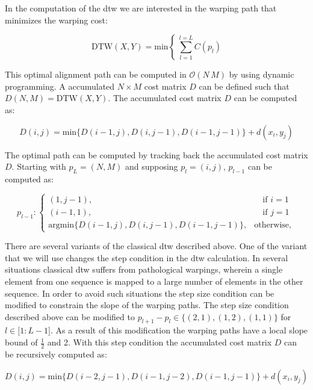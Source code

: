 In the computation of the \gls{dtw} we are interested in the warping path that minimizes the warping cost:

\begin{equation}
\mathrm{DTW}(X,Y) = \mathrm{min} \left\lbrace ~\sum_{l=1}^{l=L}C(p_l)\right.
\end{equation}

This optimal alignment path can be computed in $\mathcal{O}(N\,M)$ by using dynamic programming. A accumulated  $N \times M$ cost matrix $D$ can be defined such that $D(N,M) = \mathrm{DTW}(X,Y)$. The accumulated cost matrix $D$ can be computed as:

\begin{equation}
	D(i,j) = \mathrm{min} \lbrace D(i-1,j), D(i,j-1), D(i-1,j-1)\rbrace + d(x_i, y_j)
\end{equation}

The optimal path can be computed by tracking back the accumulated cost matrix $D$. Starting with $p_L = (N,M)$ and supposing $p_l = (i,j)$, $p_{l-1}$ can be computed as:

\begin{equation}
	p_{l-1} : \begin{cases}
	(1, j-1), & \quad \text{if } i=1\\
	(i-1, 1), & \quad \text{if } j=1\\	
	\mathrm{argmin} \lbrace D(i-1,j), D(i,j-1), D(i-1,j-1)\rbrace, & \mathrm{otherwise},
	\end{cases}
\end{equation}

There are several variants of the classical \gls{dtw} described above. One of the variant that we will use changes the step condition in the \gls{dtw} calculation. In several situations classical \gls{dtw} suffers from pathological warpings, wherein a single element from one sequence is mapped to a large number of elements in the other sequence. In order to avoid such situations the step size condition can be modified to constrain the slope of the warping paths. The step size condition described above can be modified to $p_{l+1}-p_l \in \lbrace (2,1), (1,2), (1,1) \rbrace$ for $l \in \lbrack 1: L-1 \rbrack$. As a result of this modification the warping paths have a local slope bound of $\frac{1}{2}$ and 2. With this step condition the accumulated cost matrix $D$ can be recursively computed as:

\begin{equation}
D(i,j) = \mathrm{min} \lbrace D(i-2,j-1), D(i-1,j-2), D(i-1,j-1)\rbrace + d(x_i, y_j)
\end{equation}

